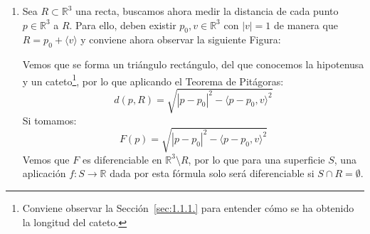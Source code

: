 \begin{ejemplo}
\begin{enumerate}
\begin{enumerate}
            Si consideramos ahora $f:S\to\mathbb{R}$ dada por $f(p) = |p-p_0|$, solo podremos demostrar que $f$ es diferenciable si $p_0\notin S$, puesto que $F:\mathbb{R}^3\to\mathbb{R}$ dada por $F(p) = |p-p_0|$ es diferenciable en $\mathbb{R}^3\setminus \{p_0\}$.

        \item Sea $R\subset \mathbb{R}^3$ una recta, buscamos ahora medir la distancia de cada punto $p\in \mathbb{R}^3$ a $R$. Para ello, deben existir $p_0,v\in \mathbb{R}^3$ con $|v| = 1$ de manera que $R = p_0 + \langle v \rangle $ y conviene ahora observar la siguiente Figura:
            \begin{figure}[H]
                \centering
            \end{figure}
            \noindent
            Vemos que se forma un triángulo rectángulo, del que conocemos la hipotenusa y un cateto\footnote{Conviene observar la Sección~\ref{sec:1.1.1.} para entender cómo se ha obtenido la longitud del cateto.}, por lo que aplicando el Teorema de Pitágoras:
            \begin{equation*}
                d(p,R) = \sqrt{|p-p_0|^2 - \langle p-p_0,v \rangle^2}
            \end{equation*}
            Si tomamos:
            \begin{equation*}
                F(p) = \sqrt{|p-p_0|^2 - \langle p-p_0,v \rangle^2}
            \end{equation*}
            Vemos que $F$ es diferenciable en $\mathbb{R}^3\setminus R$, por lo que para una superficie $S$, una aplicación $f:S\to\mathbb{R}$ dada por esta fórmula solo será diferenciable si $S\cap R = \emptyset $.


\end{enumerate}
\end{enumerate}
\end{ejemplo}
